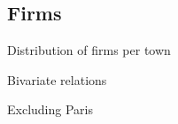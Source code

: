 \documentclass[12pt]{beamer}
\begin{document}
\subsection{Firms}


\begin{frame}{\textcolor{bscuro}{Distribution of firms per town}}
	\begin{figure}[!ht] 
		\centering
	\end{figure}
\end{frame}


\begin{frame}{\textcolor{bscuro}{Bivariate relations}}
\begin{figure}[!ht] 
	\centering
\end{figure}
Excluding Paris
\end{frame}
\end{document}
